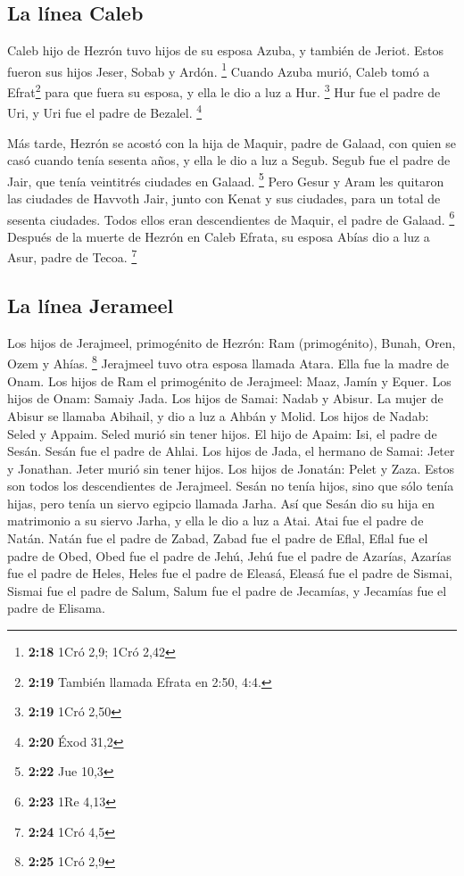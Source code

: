 \hypertarget{la-luxednea-caleb}{%
\subsection{La línea Caleb}\label{la-luxednea-caleb}}

 Caleb hijo de Hezrón tuvo hijos de su esposa Azuba, y
también de Jeriot. Estos fueron sus hijos Jeser, Sobab y Ardón.
\footnote{\textbf{2:18} 1Cró 2,9; 1Cró 2,42}  Cuando
Azuba murió, Caleb tomó a Efrat\footnote{\textbf{2:19} También llamada
  Efrata en 2:50, 4:4.} para que fuera su esposa, y ella le dio a luz a
Hur. \footnote{\textbf{2:19} 1Cró 2,50}  Hur fue el padre
de Uri, y Uri fue el padre de Bezalel. \footnote{\textbf{2:20} Éxod 31,2}

 Más tarde, Hezrón se acostó con la hija de Maquir, padre
de Galaad, con quien se casó cuando tenía sesenta años, y ella le dio a
luz a Segub.  Segub fue el padre de Jair, que tenía
veintitrés ciudades en Galaad. \footnote{\textbf{2:22} Jue 10,3}
 Pero Gesur y Aram les quitaron las ciudades de Havvoth
Jair, junto con Kenat y sus ciudades, para un total de sesenta ciudades.
Todos ellos eran descendientes de Maquir, el padre de Galaad.
\footnote{\textbf{2:23} 1Re 4,13}  Después de la muerte
de Hezrón en Caleb Efrata, su esposa Abías dio a luz a Asur, padre de
Tecoa. \footnote{\textbf{2:24} 1Cró 4,5}

\hypertarget{la-luxednea-jerameel}{%
\subsection{La línea Jerameel}\label{la-luxednea-jerameel}}

 Los hijos de Jerajmeel, primogénito de Hezrón: Ram
(primogénito), Bunah, Oren, Ozem y Ahías. \footnote{\textbf{2:25} 1Cró
  2,9}  Jerajmeel tuvo otra esposa llamada Atara. Ella
fue la madre de Onam.  Los hijos de Ram el primogénito de
Jerajmeel: Maaz, Jamín y Equer.  Los hijos de Onam:
Samaiy Jada. Los hijos de Samai: Nadab y Abisur.  La
mujer de Abisur se llamaba Abihail, y dio a luz a Ahbán y Molid.
 Los hijos de Nadab: Seled y Appaim. Seled murió sin
tener hijos.  El hijo de Apaim: Isi, el padre de Sesán.
Sesán fue el padre de Ahlai.  Los hijos de Jada, el
hermano de Samai: Jeter y Jonathan. Jeter murió sin tener hijos.
 Los hijos de Jonatán: Pelet y Zaza. Estos son todos los
descendientes de Jerajmeel.  Sesán no tenía hijos, sino
que sólo tenía hijas, pero tenía un siervo egipcio llamada Jarha.
 Así que Sesán dio su hija en matrimonio a su siervo
Jarha, y ella le dio a luz a Atai.  Atai fue el padre de
Natán. Natán fue el padre de Zabad,  Zabad fue el padre
de Eflal, Eflal fue el padre de Obed,  Obed fue el padre
de Jehú, Jehú fue el padre de Azarías,  Azarías fue el
padre de Heles, Heles fue el padre de Eleasá,  Eleasá fue
el padre de Sismai, Sismai fue el padre de Salum,  Salum
fue el padre de Jecamías, y Jecamías fue el padre de Elisama.

